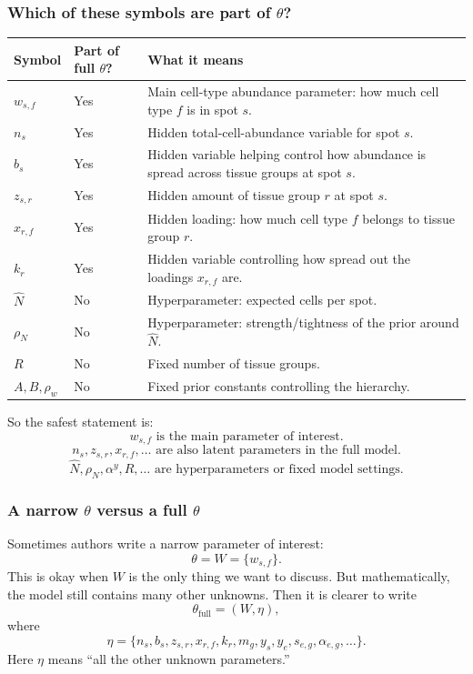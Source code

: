 \documentclass[11pt]{article}
\begin{document}
\subsubsection*{Which of these symbols are part of $\theta$?}

\begin{center}
\begin{tabularx}{0.97\textwidth}{>{\bfseries}p{}p{}X}
\toprule
Symbol & Part of full $\theta$? & What it means \\
\midrule
$w_{s,f}$ & Yes & Main cell-type abundance parameter: how much cell type $f$ is in spot $s$. \\
$n_s$ & Yes & Hidden total-cell-abundance variable for spot $s$. \\
$b_s$ & Yes & Hidden variable helping control how abundance is spread across tissue groups at spot $s$. \\
$z_{s,r}$ & Yes & Hidden amount of tissue group $r$ at spot $s$. \\
$x_{r,f}$ & Yes & Hidden loading: how much cell type $f$ belongs to tissue group $r$. \\
$k_r$ & Yes & Hidden variable controlling how spread out the loadings $x_{r,f}$ are. \\
$\hat N$ & No & Hyperparameter: expected cells per spot. \\
$\rho_N$ & No & Hyperparameter: strength/tightness of the prior around $\hat N$. \\
$R$ & No & Fixed number of tissue groups. \\
$A,B,\rho_w$ & No & Fixed prior constants controlling the hierarchy. \\
\bottomrule
\end{tabularx}
\end{center}

So the safest statement is:
\[
\boxed{\text{$w_{s,f}$ is the main parameter of interest.}}
\]
\[
\boxed{\text{$n_s,z_{s,r},x_{r,f},\ldots$ are also latent parameters in the full model.}}
\]
\[
\boxed{\text{$\hat N,\rho_N,\alpha^y,R,\ldots$ are hyperparameters or fixed model settings.}}
\]

\subsubsection*{A narrow $\theta$ versus a full $\theta$}

Sometimes authors write a narrow parameter of interest:
\[
\theta=W=\{w_{s,f}\}.
\]
This is okay when $W$ is the only thing we want to discuss. But mathematically, the model still contains many other unknowns. Then it is clearer to write
\[
\theta_{\mathrm{full}}=(W,\eta),
\]
where
\[
\eta=\{n_s,b_s,z_{s,r},x_{r,f},k_r,m_g,y_s,y_e,s_{e,g},\alpha_{e,g},\ldots\}.
\]
Here $\eta$ means ``all the other unknown parameters.''
\end{document}
